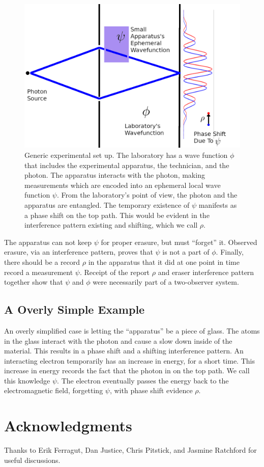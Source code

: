 \documentclass[12pt,a4paper]{article}
\theoremstyle{myrule}
\theoremstyle{postulate}
\theoremstyle{definition}
\begin{document}
\begin{figure}[h]
\centering
\includegraphics[scale=1.3]{experiment.png}
\caption{Generic experimental set up.  The laboratory has a wave function $\phi$ that includes the experimental apparatus, the technician, and the photon.  The apparatus interacts with the photon, making measurements which are encoded into an ephemeral local wave function $\psi$.  From the laboratory's point of view, the photon and the apparatus are entangled.  The temporary existence of $\psi$ manifests as a phase shift on the top path.  This would be evident in the interference pattern existing and shifting, which we call $\rho$.}
\label{anb}
\end{figure}

The apparatus can not keep $\psi$ for proper erasure, but must ``forget'' it.  Observed erasure, via an interference pattern, proves that $\psi$ is not a part of $\phi$.  Finally, there should be a record $\rho$ in the apparatus that it did at one point in time record a measurement $\psi$.  Receipt of the report $\rho$ and eraser interference pattern together show that $\psi$ and $\phi$ were necessarily part of a two-observer system.

\subsection{A Overly Simple Example}
An overly simplified case is letting the ``apparatus'' be a piece of glass.  The atoms in the glass interact with the photon and cause a slow down inside of the material.  This results in a phase shift and a shifting interference pattern.  An interacting electron temporarily has an increase in energy, for a short time.  This increase in energy records the fact that the photon in on the top path.  We call this knowledge $\psi$.  The electron eventually passes the energy back to the electromagnetic field, forgetting $\psi$, with phase shift evidence $\rho$.

\section{Acknowledgments}
Thanks to Erik Ferragut, Dan Justice, Chris Pitstick, and Jasmine Ratchford for useful discussions.



\end{document}
